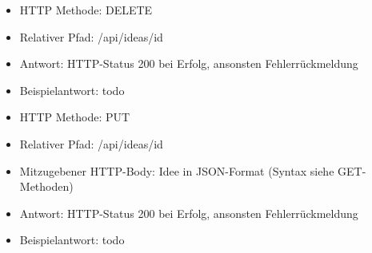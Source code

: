 \begin{itemize}
    \item HTTP Methode: DELETE
    \item Relativer Pfad: /api/ideas/{id}
    \item Antwort: HTTP-Status 200 bei Erfolg, ansonsten Fehlerrückmeldung
    \item Beispielantwort: todo
\end{itemize}

\begin{itemize}
    \item HTTP Methode: PUT
    \item Relativer Pfad: /api/ideas/{id}
    \item Mitzugebener HTTP-Body: Idee in JSON-Format (Syntax siehe GET-Methoden)
    \item Antwort: HTTP-Status 200 bei Erfolg, ansonsten Fehlerrückmeldung
    \item Beispielantwort: todo
\end{itemize}

%



